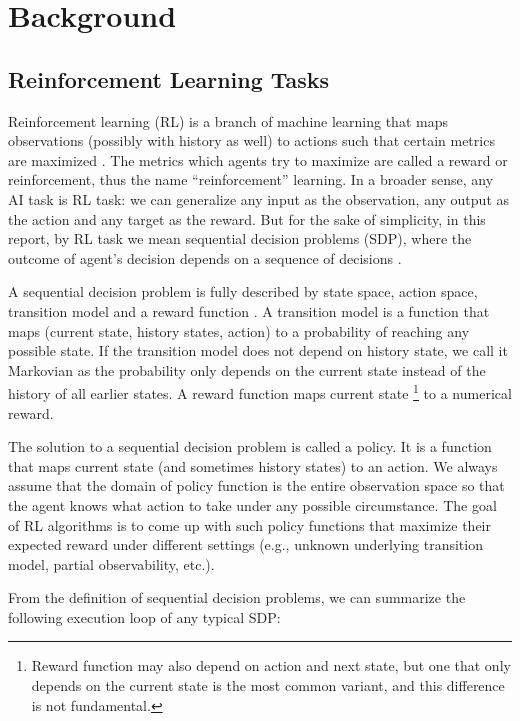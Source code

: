 \documentclass[fyp]{socreport}
\begin{document}
\section{Background}
\subsection{Reinforcement Learning Tasks}
Reinforcement learning (RL) is a branch of machine learning that maps observations (possibly with history as well) to actions such that certain metrics are maximized \cite{sutton-barto}. The metrics which agents try to maximize are called a reward or reinforcement, thus the name “reinforcement” learning. In a broader sense, any AI task is RL task: we can generalize any input as the observation, any output as the action and any target as the reward. But for the sake of simplicity, in this report, by RL task we mean sequential decision problems (SDP), where the outcome of agent’s decision depends on a sequence of decisions \cite{russell}.

A sequential decision problem is fully described by state space, action space, transition model and a reward function \cite{russell}. A transition model is a function that maps (current state, history states, action) to a probability of reaching any possible state. If the transition model does not depend on history state, we call it Markovian as the probability only depends on the current state instead of the history of all earlier states. A reward function maps current state \footnote{Reward function may also depend on action and next state, but one that only depends on the current state is the most common variant, and this difference is not fundamental.} to a numerical reward.

The solution to a sequential decision problem is called a policy. It is a function that maps current state (and sometimes history states) to an action. We always assume that the domain of policy function is the entire observation space so that the agent knows what action to take under any possible circumstance. The goal of RL algorithms is to come up with such policy functions that maximize their expected reward under different settings (e.g., unknown underlying transition model, partial observability, etc.).

From the definition of sequential decision problems, we can summarize the following execution loop of any typical SDP:
\end{document}
